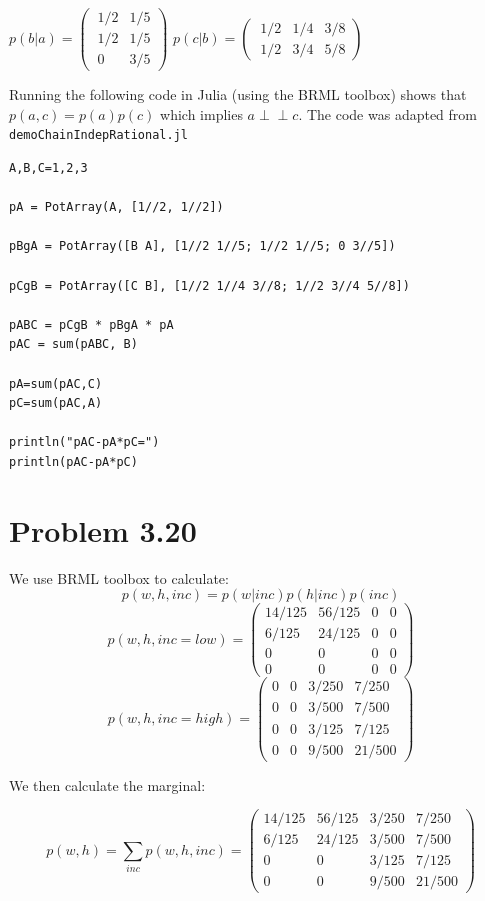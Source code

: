 \documentclass[11pt,a4paper,oneside]{report}
\newcommand\ci{\perp\!\!\!\perp} %
\begin{document}
$ p(b|a) = \begin{pmatrix}
   \ 1/2 & 1/5 \\[0.4em]
   \ 1/2 & 1/5 \\[0.4em]
   \ 0 & 3/5
 \end{pmatrix} 
$
$ p(c|b) = \begin{pmatrix}
   \ 1/2 & 1/4 & 3/8 \\[0.4em]
   \ 1/2 & 3/4 & 5/8
 \end{pmatrix} 
$

Running the following code in Julia (using the BRML toolbox) shows that $p(a,c) 
= p(a)p(c)$ which implies $a \ci c$. The code was adapted from 
\texttt{demoChainIndepRational.jl}

\begin{lstlisting}
A,B,C=1,2,3

pA = PotArray(A, [1//2, 1//2])

pBgA = PotArray([B A], [1//2 1//5; 1//2 1//5; 0 3//5])

pCgB = PotArray([C B], [1//2 1//4 3//8; 1//2 3//4 5//8])

pABC = pCgB * pBgA * pA
pAC = sum(pABC, B)

pA=sum(pAC,C)
pC=sum(pAC,A)

println("pAC-pA*pC=")
println(pAC-pA*pC)

\end{lstlisting}


\section*{Problem 3.20}

We use BRML toolbox to calculate:
$$p(w,h,inc) = p(w|inc)p(h|inc)p(inc)$$
$$p(w,h,inc = low) = 
\begin{pmatrix}
 14/125 & 56/125 & 0 & 0\\
  6/125 & 24/125 & 0 & 0\\
  0   &  0   & 0 & 0\\
  0   &  0   & 0 & 0
\end{pmatrix}
$$
$$p(w,h,inc = high) = 
\begin{pmatrix}
 0 & 0 & 3/250 &  7/250\\
 0 & 0 & 3/500 &  7/500\\
 0 & 0 & 3/125 &  7/125\\
 0 & 0 & 9/500 & 21/500
\end{pmatrix}
$$

We then calculate the marginal:

$$p(w,h) = \sum_{inc}p(w,h,inc) = 
\begin{pmatrix}
 14/125 & 56/125 & 3/250 &  7/250\\
  6/125 & 24/125 & 3/500 &  7/500\\
  0    & 0   & 3/125 &  7/125\\
  0    & 0   & 9/500 & 21/500
\end{pmatrix}
$$
\end{document}
